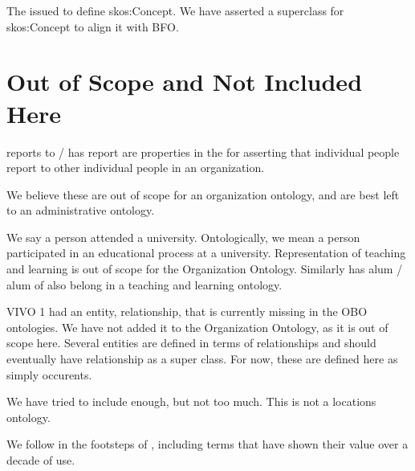 \documentclass[letterpaper,10pt,english]{sphinxmanual}
\begin{document}
\begin{sphinxShadowBox}

\sphinxAtStartPar
The  issued to define skos:Concept.  We have asserted a superclass for
skos:Concept
to align it with BFO.
\end{sphinxShadowBox}


\section{Out of Scope and Not Included Here}
\label{\detokenize{out-of-scope:out-of-scope-and-not-included-here}}
\begin{sphinxShadowBox}

\sphinxAtStartPar
reports to / has report are properties in the  for
asserting that individual people report to other individual people in an organization.

\sphinxAtStartPar
We believe these are out of scope for an organization ontology, and are best left to
an
administrative ontology.
\end{sphinxShadowBox}

\begin{sphinxShadowBox}

\sphinxAtStartPar
We say a person attended a university.  Ontologically, we mean a person participated
in an educational process at a university. Representation of teaching and learning
is out of scope for the Organization Ontology.  Similarly has alum / alum of also
belong in a teaching and learning ontology.
\end{sphinxShadowBox}

\begin{sphinxShadowBox}

\sphinxAtStartPar
VIVO 1 had an entity, relationship, that is currently missing in the OBO ontologies.
We have not added it to the Organization Ontology, as it is out of scope here.
Several entities are defined in terms of relationships and should eventually have
relationship as a super class.  For now, these are defined here as simply
occurents.
\end{sphinxShadowBox}

\begin{sphinxShadowBox}

\sphinxAtStartPar
We have tried to include enough, but not too much.  This is not a locations
ontology. %
\begin{footnote}[2]\sphinxAtStartFootnote
We follow in the footsteps of {\hyperref[\detokenize{glossary:glossary}]{}}, including terms that have
shown their value over a decade of use.
%
\end{footnote}
\end{sphinxShadowBox}
\end{document}

